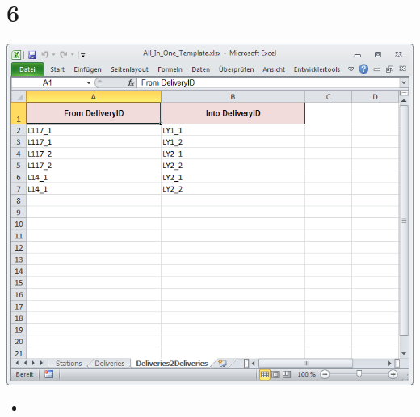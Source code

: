 \documentclass{beamer}
\begin{document}
\section{6}
\begin{frame}
	\begin{center}
  		\includegraphics[height=0.6\textheight]{6.png}
	\end{center}
	\begin{itemize}
		\item
	\end{itemize}
\end{frame}
\end{document}
